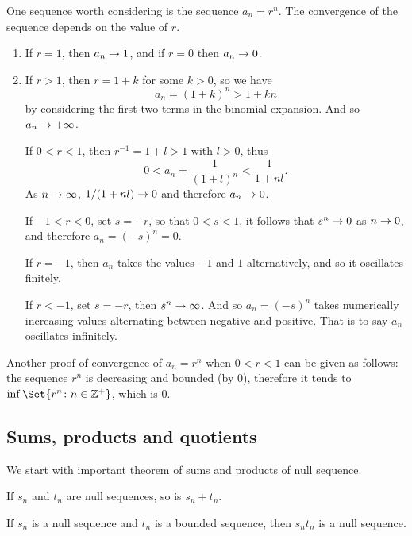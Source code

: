 \documentclass[main.tex]{subfiles}
\begin{document}
	One sequence worth considering is the sequence $a_n = r^n$. The convergence of the sequence depends on the value of $r$.
	\begin{enumerate}
		\item If $r = 1$, then $a_n \rightarrow 1$, and if $r = 0$ then $a_n \rightarrow 0$.
		
		\item If $r > 1$, then $r = 1 + k$ for some $k > 0$, so we have
		\begin{equation*}
		a_n = \left(1 + k\right)^n > 1 + kn
		\end{equation*}
		by considering the first two terms in the binomial expansion. And so $a_n \rightarrow +\infty$.
		
		\ii If $0 < r < 1$, then $r^{-1} = 1 + l > 1$ with $l > 0$, thus
		\begin{equation*}
			0 < a_n = \frac{1}{\left(1 + l\right)^n} < \frac{1}{1 + nl}.
		\end{equation*}
		As $n \rightarrow \infty$, $1/(1 + nl) \rightarrow 0$ and therefore $a_n \rightarrow 0$.
		
		\ii If $-1 < r < 0$, set $s = -r$, so that $0 < s < 1$, it follows that $s^n \rightarrow 0$ as $n \rightarrow 0$, and therefore $a_n = (-s)^n = 0$.
		
		\ii If $r = -1$, then $a_n$ takes the values $-1$ and $1$ alternatively, and so it oscillates finitely.
		
		\ii If $r < -1$, set $s = -r$, then $s^n \rightarrow \infty$. And so $a_n = (-s)^n$ takes numerically increasing values alternating between negative and positive. That is to say $a_n$ oscillates infinitely.
 	\end{enumerate}
	Another proof of convergence of $a_n = r^n$ when $0 < r < 1$ can be given as follows: the sequence $r^n$ is decreasing and bounded (by 0), therefore it tends to $\inf\Set{r^n \colon n \in \ZZ^{+}}$, which is 0.
		
	\subsection{Sums, products and quotients}
	We start with important theorem of sums and products of null sequence.
	\begin{theorem}
		If $s_n$ and $t_n$ are null sequences, so is $s_n + t_n$.
	\end{theorem}
	\begin{theorem}
		If $s_n$ is a null sequence and $t_n$ is a bounded sequence, then $s_n t_n$ is a null sequence.
	\end{theorem}
	
\end{document}
